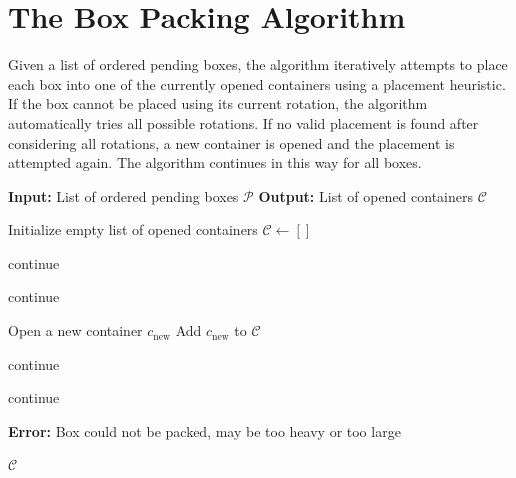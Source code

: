 \section{The Box Packing Algorithm}

Given a list of ordered pending boxes, the algorithm iteratively attempts to place each box into one of the currently opened containers using a placement heuristic. 
If the box cannot be placed using its current rotation, the algorithm automatically tries all possible rotations. 
If no valid placement is found after considering all rotations, a new container is opened and the placement is attempted again. 
The algorithm continues in this way for all boxes.

\begin{algorithm}[htbp]
\centering
\begin{minipage}{0.95\linewidth}
\begin{algorithmic}[1]
\State \textbf{Input:} List of ordered pending boxes $\mathcal{P}$
\State \textbf{Output:} List of opened containers $\mathcal{C}$

\State Initialize empty list of opened containers $\mathcal{C} \gets []$


        \State continue
    \EndIf

        \State continue
    \EndIf

    \State Open a new container $c_{\text{new}}$
    \State Add $c_{\text{new}}$ to $\mathcal{C}$

        \State continue
    \EndIf

        \State continue
    \EndIf

    \State \textbf{Error:} Box could not be packed, may be too heavy or too large
\EndFor

\State \Return $\mathcal{C}$
\end{algorithmic}
\end{minipage}
\caption{Box Packing Algorithm Pseudocode}
\label{alg:box-packing}
\end{algorithm}







